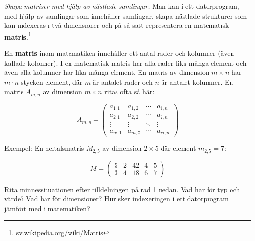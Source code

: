 

\Exercise{\ExeWeekNINE}

\begin{Goals}
\item 
\end{Goals}

\begin{Preparations}
\item 
\end{Preparations}

\BasicTasks %

\Task \emph{Skapa matriser med hjälp av nästlade samlingar.} Man kan i ett datorprogram, med hjälp av samlingar som innehåller samlingar, skapa nästlade strukturer som kan indexeras i två dimensioner och på så sätt representera en matematisk \textbf{matris}.\footnote{\href{https://sv.wikipedia.org/wiki/Matris}{sv.wikipedia.org/wiki/Matris}} 
\begin{Background}
En \textbf{matris} inom matematiken innehåller ett antal rader och kolumner (även kallade kolonner). I en matematisk matris har alla rader lika många element och även alla kolumner har lika många element. En matris av dimension $m\times{}n$ har $m \cdot n$ stycken element, där $m$ är antalet rader och $n$ är antalet kolumner. En matris $A_{m,n}$ av dimension $m\times{}n$ ritas ofta så här:

\[
A_{m,n} = 
 \begin{pmatrix}
  a_{1,1} & a_{1,2} & \cdots & a_{1,n} \\
  a_{2,1} & a_{2,2} & \cdots & a_{2,n} \\
  \vdots  & \vdots  & \ddots & \vdots  \\
  a_{m,1} & a_{m,2} & \cdots & a_{m,n} 
 \end{pmatrix}
\]

\noindent Exempel: En heltalsmatris $M_{2,5}$ av dimension $2\times{}5$ där element $m_{2,5}=7$:

\[
M=
  \begin{pmatrix}
    5 & 2 & 42 & 4 & 5 \\
    3 & 4 & 18 & 6 & 7
  \end{pmatrix}
\]
\end{Background}

\Subtask\Pen Rita minnessituationen efter tilldelningen på rad 1 nedan. Vad har  för typ och värde? Vad har  för dimensioner? Hur sker indexeringen i ett datorprogram jämfört med i matematiken?

